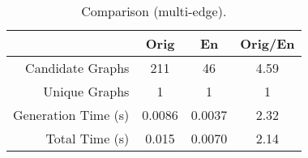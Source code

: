 \begin{table}[!ht]
\centering
\caption{Comparison (multi-edge).\label{tb:app1:multiedge-ex1}}
\begin{tabular}{r | c | c | c}
\hline \hline
& Orig & En & Orig/En \\
\hline
Candidate Graphs & 211 & 46 & 4.59 \\ 
Unique Graphs & 1 & 1 & 1 \\
Generation Time (s) & 0.0086 & 0.0037 & 2.32 \\
Total Time (s) & 0.015 & 0.0070 & 2.14 \\
\hline \hline
\end{tabular}
\end{table}